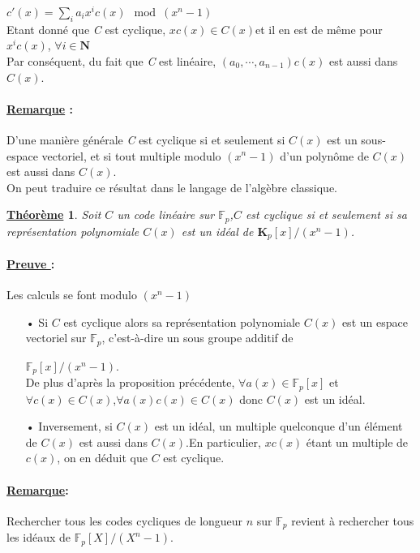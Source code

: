 \documentclass[12pt,openany]{report}
\newtheorem{theorem}{\underline{Théorème}}
\begin{document}
$c'(x)=\sum_{i} a_i x^i c(x)\mod(x^n-1) $\\
Etant donné que \textit{C} est cyclique, $ xc(x) \in \mathit{C}(x)$et il en est de même pour $ x^i c(x)$, $\forall i \in \mathbf{N} $\\
Par conséquent, du fait que \textit{C} est linéaire, $(a_0,\cdots,a_{n-1})c(x) $ est aussi dans $\mathit{C}(x) $.

\paragraph{\underline{Remarque} :}
D'une manière générale \textit{C} est cyclique si et seulement si $\mathit{C}(x)    $ est un sous-espace vectoriel, et si tout multiple modulo $(x^n-1)$ d'un polynôme de $ \mathit{C}(x)$ est aussi dans $ \mathit{C}(x)$.\\
On peut traduire ce résultat dans le langage de l'algèbre classique.
\begin{theorem}

Soit $\mathit{C}$ un code linéaire sur $\mathbb{F}_p$,$\mathit{C}$ est cyclique si et seulement si sa représentation polynomiale $ \mathit{C}(x) $ est un idéal de $\mathbf{K}_p[x]/(x^n-1)$.

\end{theorem}

\paragraph{\underline{Preuve }:\\}
Les calculs se font modulo $(x^n-1)$
\begin{itemize}
\item[•] Si $\mathit{C}$ est cyclique alors sa représentation polynomiale $\mathit{C}(x) $ est un espace vectoriel sur $\mathbb{F}_p $, c'est-à-dire un sous groupe additif de

$\mathbb{F}_p[x]/(x^n-1).$ \\
De plus d'après la proposition précédente, 
$ \forall a(x) 
\in \mathbb{F}_p[x] $ et 
$ \forall c(x) \in \mathit{C}(x) $,$ \forall a(x)c(x) \in \mathit{C}(x) $ donc $\mathit{C}(x) $ est un idéal.
\item[•] Inversement, si $\mathit{C}(x)$ est un idéal, un multiple quelconque d'un élément de $\mathit{C}(x) $ est aussi dans $ \mathit{C}(x)$.En particulier, $xc(x)$ étant un multiple de $ c(x)$, on en déduit que $\mathit{C}$ est cyclique.
\end{itemize}
\paragraph{\underline{Remarque}:\\}
Rechercher tous les codes cycliques de longueur $n$ sur $\mathbb{F}_p$ revient à rechercher tous les idéaux de $\mathbb{F}_p[X]/(X^n-1)$.
\end{document}
